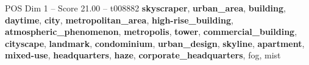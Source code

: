\begin{textsample}{POS Dim 1 – Score 21.00 – t008882}  \label{ex:f1_pos_016}
\textbf{skyscraper}, \textbf{urban\_area}, \textbf{building}, \textbf{daytime}, \textbf{city}, \textbf{metropolitan\_area}, \textbf{high-rise\_building}, \textbf{atmospheric\_phenomenon}, \textbf{metropolis}, \textbf{tower}, \textbf{commercial\_building}, \textbf{cityscape}, \textbf{landmark}, \textbf{condominium}, \textbf{urban\_design}, \textbf{skyline}, \textbf{apartment}, \textbf{mixed-use}, \textbf{headquarters}, \textbf{haze}, \textbf{corporate\_headquarters}, fog, mist

\end{textsample}
